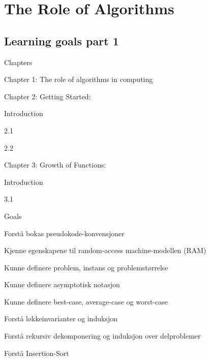 \section{The Role of Algorithms}

\subsection{Learning goals part 1}
\begin{itemize}
    \item Chapters
    \begin{todolist}
        \item Chapter 1: The role of algorithms in computing
        \item Chapter 2: Getting Started:
            \begin{todolist}
                \item Introduction
                \item 2.1
                \item 2.2
            \end{todolist}
        \item Chapter 3: Growth of Functions:
            \begin{todolist}
                \item Introduction
                \item 3.1
            \end{todolist}
        
    \end{todolist}
        \item Goals 
    \begin{todolist}
        \item Forstå bokas pseudokode-konvensjoner
        \item Kjenne egenskapene til random-access machine-modellen (RAM)
        \item Kunne definere problem, instans og problemstørrelse
        \item Kunne definere asymptotisk notasjon
        \item Kunne definere best-case, average-case og worst-case
        \item Forstå løkkeinvarianter og induksjon
        \item Forstå rekursiv dekomponering og induksjon over delproblemer
        \item Forstå Insertion-Sort
    \end{todolist}
\end{itemize}

